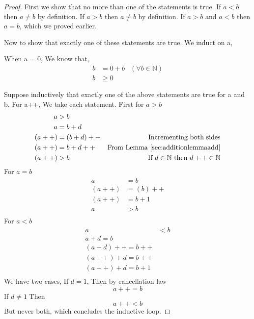 \documentclass[11pt]{report}
\begin{document}
\begin{proof}
	First we show that no more than one of the statements is true.
	If $a<b$ then $a \neq b$ by definition. If $a>b$ then $a \neq b$ by definition. If $a>b$ and $a<b$ then $a=b$, which we proved earlier.

	Now to show that exactly one of these statements are true.
	We induct on a,

	When a = 0,
	We know that,
	\begin{align*}
		b & = 0 + b & (\forall b \in \mathbb{N}) \\
		b & \geq 0  &
	\end{align*}

	Suppose inductively that exactly one of the above statements are true for a and b.
	For a++,
	We take each statement. First for $a>b$
	\begin{align*}
		a     & > b                                                                  \\
		a     & = b + d                                                              \\
		(a++) & = (b + d)++ & \text{Incrementing both sides}                         \\
		(a++) & = b + d++   & \text{From Lemma \ref{sec:additionlemmaadd}}          \\
		(a++) & > b         & \text{If $d \in \mathbb{N}$ then $d++ \in \mathbb{N}$}
	\end{align*}
	For $a=b$
	\begin{align*}
		a     & = b     \\
		(a++) & = (b)++ \\
		(a++) & = b + 1 \\
		a     & > b     \\
	\end{align*}
	For $a<b$
	\begin{align*}
		a & <b            \\
		a + d = b         \\
		(a + d)++ = b++   \\
		(a++) + d = b++   \\
		(a++) + d = b + 1 \\
	\end{align*}
	We have two cases,
	If $d = 1$,
	Then by cancellation law
	$$ a++ = b $$
	If $d \neq 1$
	Then
	$$a++ < b$$
	But never both, which concludes the inductive loop.
\end{proof}
\end{document}
